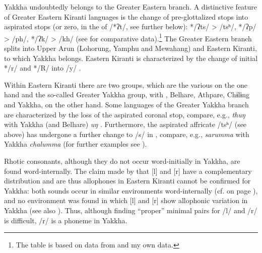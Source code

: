 Yakkha undoubtedly belongs to the Greater Eastern branch. A distinctive feature of Greater Eastern Kiranti languages is the change of pre-glottalized stops into aspirated stops  (or zero, in the  of /*ʔt/, see further below):  */ʔts/ > /tsʰ/, */ʔp/ > /ph/,  */ʔk/ > /kh/ (see  for comparative data).\footnote{The table is based on data from \citet{Driem1993A-grammar, Driem1987A-grammar, Bickeletal2009Puma, Kongren2007Yakkha} and my own data.} The Greater Eastern branch splits into Upper Arun (Lohorung, Yamphu and Mewahang) and Eastern Kiranti, to which Yakkha belongs. Eastern Kiranti is characterized by  the change of  initial */r/ and */R/ into /y/ \citep{Driem1990The-fall}.

Within Eastern Kiranti there are two groups, which are the various   on the one hand and the so-called Greater Yakkha group, with , Belhare, Athpare,  Chɨlɨng and Yakkha, on the other hand. Some languages of the Greater Yakkha branch are characterized by the loss of the aspirated coronal stop, compare, e.g.,  \emph{thuŋ}  with Yakkha (and Belhare) \emph{uŋ} \citep{Bickel1997Dictionary}. Furthermore, the aspirated affricate /tsʰ/ (see above) has undergone a further change to /s/ in , compare, e.g.,  \emph{sarumma} with Yakkha \emph{chalumma}  (for further examples see ). 

Rhotic consonants, although they do  not occur word-initially  in Yakkha, are found word-internally. The claim made by  \citet{Driem1990The-fall} that [l] and [r] have a complementary distribution and are thus allophones in Eastern Kiranti cannot be confirmed for Yakkha: both sounds occur in similar environments word-internally  (cf.   on page \pageref{r-l}), and no environment was found  in which [l] and [r] show allophonic variation  in Yakkha  (see also ). Thus, although finding “proper” minimal pairs for /l/ and /r/ is difficult, /r/ is a phoneme in Yakkha.

